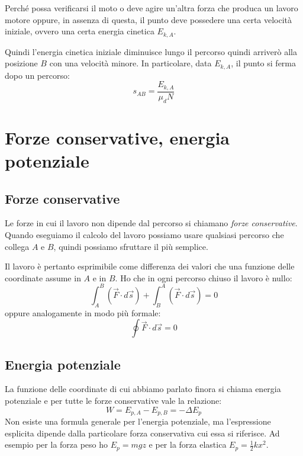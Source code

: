 \documentclass[class=book, crop=false, oneside, 12pt]{standalone}
\begin{document}
Perché possa verificarsi il moto o deve agire un'altra forza che produca un lavoro motore oppure, in assenza di questa, il punto deve possedere una certa velocità iniziale, ovvero una certa energia cinetica \(E_{k,A}\).

Quindi l'energia cinetica iniziale diminuisce lungo il percorso quindi arriverò alla posizione \(B\) con una velocità minore.\newline
In particolare, data \(E_{k,A}\), il punto si ferma dopo un percorso:
\begin{equation*}
    s_{AB} = \frac{E_{k,A}}{\mu_d N}
\end{equation*}

\section{Forze conservative, energia potenziale}

\subsection{Forze conservative}

Le forze in cui il lavoro non dipende dal percorso si chiamano \emph{forze conservative}.
Quando eseguiamo il calcolo del lavoro possiamo usare qualsiasi percorso che collega \(A\) e \(B\), quindi possiamo sfruttare il più semplice.

Il lavoro è pertanto esprimibile come differenza dei valori che una funzione delle coordinate assume in \(A\) e in \(B\).
Ho che in ogni percorso chiuso il lavoro è nullo:
\begin{equation}
    \int_A^B (\overrightarrow{F} \cdot d \overrightarrow{s}) + \int_B^A (\overrightarrow{F} \cdot d \overrightarrow{s}) = 0
\end{equation}
oppure analogamente in modo più formale:
\begin{equation}
    \oint \overrightarrow{F} \cdot d \overrightarrow{s} = 0
\end{equation}

\subsection{Energia potenziale}

La funzione delle coordinate di cui abbiamo parlato finora si chiama energia potenziale e per tutte le forze conservative vale la relazione:
\begin{equation}
    W = E_{p,A} - E_{p,B} = - \Delta E_p
\end{equation}
Non esiste una formula generale per l'energia potenziale, ma l'espressione esplicita dipende dalla particolare forza conservativa cui essa si riferisce.
Ad esempio per la forza peso ho \(E_p = mgz\) e per la forza elastica \(E_p = \frac{1}{2} k x^2\).
\end{document}
